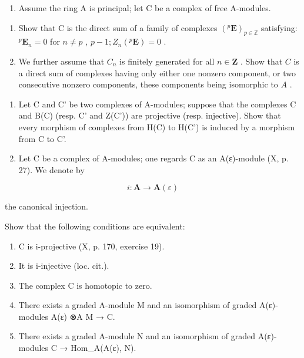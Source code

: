 
\begin{enumerate}
\def\labelenumi{\arabic{enumi})}
\tightlist
\item
  Assume the ring A is principal; let C be a complex of free A-modules.
\end{enumerate}

\begin{enumerate}
\def\labelenumi{\alph{enumi})}
\item
  Show that C is the direct sum of a family of complexes \((^{p}\mathbf{E})_{p\in \mathbb{Z}}\) satisfying: \(^{p}\mathbf{E}_{n} = 0\) for \(n\neq p\) , \(p - 1 ; Z_{n}(^{p}\mathbf{E}) = 0\) .
\item
  We further assume that \(C_n\) is finitely generated for all \(n \in \mathbf{Z}\) . Show that \(C\) is a direct sum of complexes having only either one nonzero component, or two consecutive nonzero components, these components being isomorphic to \(A\) .
\end{enumerate}

\begin{enumerate}
\def\labelenumi{\arabic{enumi})}
\setcounter{enumi}{1}
\item
  Let C and C' be two complexes of A-modules; suppose that the complexes C and B(C) (resp. C' and Z(C')) are projective (resp. injective). Show that every morphism of complexes from H(C) to H(C') is induced by a morphism from C to C'.
\item
  Let C be a complex of A-modules; one regards C as an A(ε)-module (X, p. 27). We denote by
\end{enumerate}

\[
i: \mathbf {A} \rightarrow \mathbf {A} (\varepsilon)
\]

the canonical injection.

Show that the following conditions are equivalent:

\begin{enumerate}
\def\labelenumi{(\roman{enumi})}
\item
  C is i-projective (X, p. 170, exercise 19).
\item
  It is i-injective (loc. cit.).
\item
  The complex C is homotopic to zero.
\item
  There exists a graded A-module M and an isomorphism of graded A(ε)-modules A(ε) ⊗A M → C.
\item
  There exists a graded A-module N and an isomorphism of graded A(ε)-modules C → Hom\_A(A(ε), N).
\end{enumerate}

